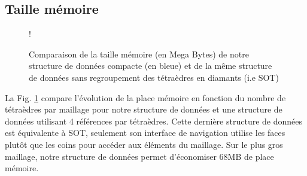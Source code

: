 \subsection{Taille mémoire}
\begin{figure}[H]
\centering
{} {!}{
\pgfplotsset{width=13cm,height=7cm}
}
\caption{Comparaison de la taille mémoire (en Mega Bytes) de notre structure de données compacte (en bleue) et de la même structure de données sans regroupement des tétraèdres en diamants (i.e SOT)}
\label{fig:taille_memoire}
\end{figure}
\noindent
La Fig. \ref{fig:taille_memoire} compare l'évolution de la place mémoire en fonction du nombre de tétraèdres par maillage pour notre structure de données et une structure de données utilisant 4 références par tétraèdres. Cette dernière structure de données est équivalente à SOT, seulement son interface de navigation utilise les faces plutôt que les coins pour accéder aux éléments du maillage. Sur le plus gros maillage, notre structure de données permet d'économiser 68MB de place mémoire.

%

